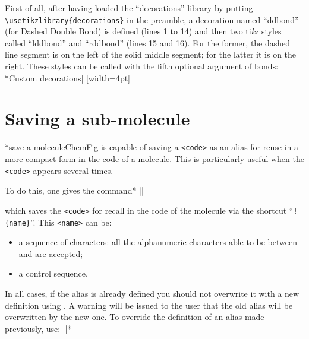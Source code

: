 \documentclass[10pt]{article}
\makeatletter
\newcommand\idx{\@ifstar{\let\print@or@not\@gobble\idx@}{\let\print@or@not\@firstofone\idx@}}
\newcommand\idx@[1]{%
	\ifcat\expandafter\noexpand\@car#1\@nil\relax%
		\expandafter\ifx\@car#1\@nil\protect
			\index{#1}%
			\print@or@not{#1}%
		\else
			\saveexpandmode\expandarg
			\StrSubstitute{\string#1}{\string @}{\@empty\protect\symbol{'100}}[\temp@]%
			\StrGobbleLeft\temp@1[\temp@]%
			\restoreexpandmode
			\expandafter\index\expandafter{\temp@ @\protect\texttt{\protect\textbackslash\temp@}}%
			\print@or@not{\texttt{\string#1}}%
		\fi
	\else
		\index{#1}%
		\print@or@not{#1}%
	\fi
}
\newcommand\make@car@active[1]{%
	\catcode`#1\active
	\begingroup
		\lccode`\~`#1\relax
		\lowercase{\endgroup\def~}%
}
\newif\if@exstar
\newcommand\exemple{%
	\begingroup
	\parskip\z@
	\@makeother\;\@makeother\!\@makeother\?\@makeother\:%
	\@ifstar{\@exstartrue\exemple@}{\@exstarfalse\exemple@}}
\newcommand\exemple@[2][65]{%
	\medbreak\noindent
	\begingroup
		\let\do\@makeother\dospecials
		\make@car@active\ { {}}%
		\make@car@active\^^M{\par\leavevmode}%
		\make@car@active\,{\leavevmode\kern\z@\string,}%
		\make@car@active\-{\leavevmode\kern\z@\string-}%
		\make@car@active\>{\leavevmode\kern\z@\string>}%
		\make@car@active\<{\leavevmode\kern\z@\string<}%
		\exemple@@{#1}{#2}%
}
\newcommand\exemple@@[3]{%
	\def\@tempa##1#3{\exemple@@@{#1}{#2}{##1}}%
	\@tempa
}
\newcommand\exemple@@@[3]{%
	\xdef\the@code{#3}%
	\endgroup
	\if@exstar
		\begingroup
			\fboxrule0.4pt
			\let\breakboxparindent\z@
			\def\bkvz@bottom{\hrule\@height\fboxrule}%
			\let\bkvz@before@breakbox\relax
			\def\bkvz@set@linewidth{\advance\linewidth\dimexpr-2\fboxrule-2\fboxsep}%
			\def\bkvz@left{\vrule\@width\fboxrule\hskip\fboxsep}%
			\def\bkvz@right{\hskip\fboxsep\vrule\@width\fboxrule}%
			\def\bkvz@top{\hbox to \hsize{%
				\vrule\@width\fboxrule\@height\fboxrule
				\leaders\bkvz@bottom\hfill
				\ECFAugie
				\fboxsep\z@
				\colorbox{black}{\kern0.25em\color{white}\footnotesize\lower0.5ex\hbox{\strut#2}\kern0.25em}%
				\leaders\bkvz@bottom\hfill
				\vrule\@width\fboxrule\@height\fboxrule}}%
			\breakbox
				\kern.5ex\relax
				\ttfamily\footnotesize\the@code\par
				\normalfont
				\kern3pt
				\hrule height0.1pt width\linewidth depth0.1pt
				\vskip5pt
				\rightskip0pt plus 1fill
				\everypar{{\color{lightgray}\rlap{\vrule height0.1pt width\linewidth depth0.1pt}}\hskip0pt plus 1fill}%
				\newlinechar`\^^M\everyeof{\noexpand}\scantokens{#3}\par
			\endbreakbox
		\endgroup
	\else
		\vskip0.5ex
		\boxput*(0,1)
			{\fboxsep\z@
			\hbox{\ECFAugie\colorbox{black}{\leavevmode\kern0.25em{\color{white}\footnotesize\strut#2}\kern0.25em}}%
			}%
			{\fboxsep5pt
			\fbox{%
				$\vcenter{\hsize\dimexpr0.#1\linewidth-\fboxsep-\fboxrule\relax
					\kern5pt\parskip0pt \ttfamily\footnotesize\the@code}%
				\vcenter{\kern5pt\hsize\dimexpr\linewidth-0.#1\linewidth-\fboxsep-\fboxrule\relax
					\everypar{{\color{lightgray}\rlap{\vrule height0.1pt width\dimexpr\linewidth-0.#1\linewidth-\fboxsep-\fboxrule depth0.1pt}}}%
					\footnotesize\newlinechar`\^^M\everyeof{\noexpand}\scantokens{#3}}$%
				}%
			}%
	\fi
	\medbreak
	\endgroup
}
\let\do\@makeother\dospecials
\newcommand\CF{{\ECFAugie ChemFig}\xspace}
\newcommand\TIKZ{ti\textit kz\xspace}
\makeatother
\begin{document}
First of all, after having loaded the ``decorations'' library by putting \verb-\usetikzlibrary{decorations}- in the preamble, a decoration named ``ddbond'' (for Dashed Double Bond) is defined (lines 1 to 14) and then two \TIKZ styles called ``lddbond'' and ``rddbond'' (lines 15 and 16). For the former, the dashed line segment is on the left of the solid middle segment; for the latter it is on the right. These styles can be called with the fifth optional argument of bonds:
\exemple*{Custom decorations}|
{
  [width=4pt]
  {
    \pgfpathlineto{\pgfpoint{4pt}{0pt}}
    \pgfpathmoveto{\pgfpoint{2pt}{2pt}}
    \pgfpathlineto{\pgfpoint{4pt}{2pt}}
    \pgfpathmoveto{\pgfpoint{4pt}{0pt}}
  }
  {
    \pgfpathlineto{\pgfpointdecoratedpathlast}
  }
}
\setatomsep{4em}
|

\section{Saving a sub-molecule}\label{definesubmol}
\idx*{save a molecule}\CF is capable of saving a \verb-<code>- as an alias for reuse in a more compact form in the code of a molecule. This is particularly useful when the \verb-<code>- appears several times.

To do this, one gives the command\idx*{}
\centerverb||
\smallskip

which saves the \verb/<code>/ for recall in the code of the molecule via the shortcut ``\verb/!{name}/''. This \verb-<name>- can be:
\begin{itemize}
	\item a sequence of characters: all the alphanumeric characters able to be between \texttt{\string\csname} and \texttt{\string\endcsname} are accepted;
	\item a control sequence.
\end{itemize}

In all cases, if the alias is already defined you should not overwrite it with a new definition using \idx{\definesubmol}. A warning will be issued to the user that the old alias will be overwritten by the new one. To override the definition of an alias made previously, use:\label{redefinesubmol}
\centerverb||\idx*{\redefinesubmol}
\smallskip
\end{document}
